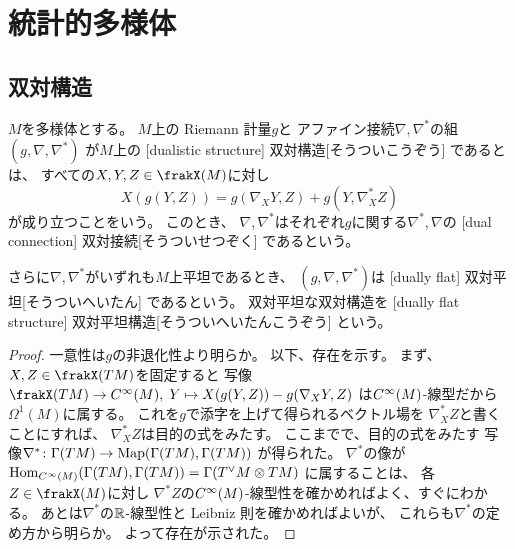 \documentclass[report]{jlreq}
\begin{document}
%
\chapter{統計的多様体}

%
\section{双対構造}

\begin{definition}[双対構造]
    $M$を多様体とする。
    $M$上の
    Riemann 計量$g$と
    アファイン接続$\nabla, \nabla^*$の組
    $(g, \nabla, \nabla^*)$
    が$M$上の
    [dualistic structure]
        {双対構造}[そうついこうぞう]
    であるとは、
    すべての$X, Y, Z \in \frakX(M)$に対し
    \begin{equation}
        X(g(Y, Z))
            =
                g(\nabla_X Y, Z) + g(Y, \nabla^*_X Z)
    \end{equation}
    が成り立つことをいう。
    このとき、
    $\nabla, \nabla^*$はそれぞれ$g$に関する$\nabla^*, \nabla$の
    [dual connection]
        {双対接続}[そうついせつぞく]
    であるという。

    さらに$\nabla, \nabla^*$がいずれも$M$上平坦であるとき、
    $(g, \nabla, \nabla^*)$は
    [dually flat]
        {双対平坦}[そうついへいたん]
    であるという。
    双対平坦な双対構造を
    [dually flat structure]
        {双対平坦構造}[そうついへいたんこうぞう]
    という。
\end{definition}


\begin{proof}
    一意性は$g$の非退化性より明らか。
    以下、存在を示す。
    まず、$X, Z \in \frakX(TM)$を固定すると
    写像$\frakX(TM) \to \smooth(M), \;
        Y \mapsto X(g(Y, Z)) - g(\nabla_X Y, Z)$
    は$C^\infty(M)$-線型だから$\Omega^1(M)$に属する。
    これを$g$で添字を上げて得られるベクトル場を
    $\nabla^*_X Z$と書くことにすれば、
    $\nabla^*_X Z$は目的の式をみたす。
    ここまでで、目的の式をみたす
    写像$\nabla^* \colon \Gamma(TM) \to \operatorname{Map}(\Gamma(TM), \Gamma(TM))$
    が得られた。
    $\nabla^*$の像が
    $\operatorname{Hom}_{C^\infty(M)}(\Gamma(TM), \Gamma(TM)) = \Gamma(T^\vee M \otimes TM)$
    に属することは、
    各$Z \in \frakX(M)$に対し
    $\nabla^* Z$の$C^\infty(M)$-線型性を確かめればよく、すぐにわかる。
    あとは$\nabla^*$の$\mathbb{R}$-線型性と Leibniz 則を確かめればよいが、
    これらも$\nabla^*$の定め方から明らか。
    よって存在が示された。
\end{proof}
\end{document}
